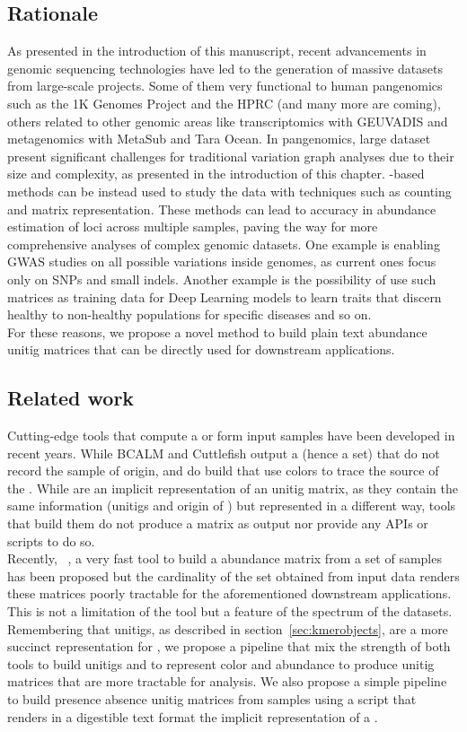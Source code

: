 \subsection{Rationale}
As presented in the introduction of this manuscript, recent advancements in genomic sequencing technologies have led to the generation of massive datasets from large-scale projects. Some of them very functional to human pangenomics such as the 1K Genomes Project and the HPRC (and many more are coming), others related to other genomic areas like transcriptomics with GEUVADIS and metagenomics with MetaSub and Tara Ocean. In pangenomics, large dataset present significant challenges for traditional variation graph analyses due to their size and complexity, as presented in the introduction of this chapter. \kmer-based methods can be instead used to study the data with techniques such as \kmer counting and matrix representation. These methods can lead to accuracy in abundance estimation of loci across multiple samples, paving the way for more comprehensive analyses of complex genomic datasets. One example is enabling GWAS studies on all possible variations inside genomes, as current ones focus only on SNPs and small indels. Another example is the possibility of use such matrices as training data for Deep Learning models to learn traits that discern healthy to non-healthy populations for specific diseases and so on.\\
For these reasons, we propose a novel method to build plain text abundance unitig matrices that can be directly used for downstream applications.

\subsection{Related work}
Cutting-edge tools that compute a \cdbg or \ccdbgs form input samples have been developed in recent years. While BCALM and Cuttlefish output   a \cdbg (hence a \kmer set) that do not record the sample of origin, \bifrost and \ggcat do build \ccdbgs that use colors to trace the source of the \kmers. While \ccdbgs are an implicit representation of an unitig matrix, as they contain the same information (unitigs and origin of \kmers) but represented in a different way, tools that build them do not produce a matrix as output nor provide any APIs or scripts to do so.\\
Recently, \kmt~\cite{kmtricks}, a very fast tool to build a \kmer abundance matrix from a set of samples has been proposed but the cardinality of the \kmer set obtained from input data renders these matrices poorly tractable for the aforementioned downstream applications. This is not a limitation of the tool but a feature of the \kmer spectrum of the datasets.\\
Remembering that unitigs, as described in section~\ref{sec:kmerobjects}, are a more succinct representation for \kmers, we propose a pipeline that mix the strength of both \cdbg tools to build unitigs and \kmt to represent \kmer color and abundance to produce unitig matrices that are more tractable for analysis. We also propose a simple pipeline to build presence absence unitig matrices from samples using a script that renders in a digestible text format the implicit representation of a \ccdbg.
